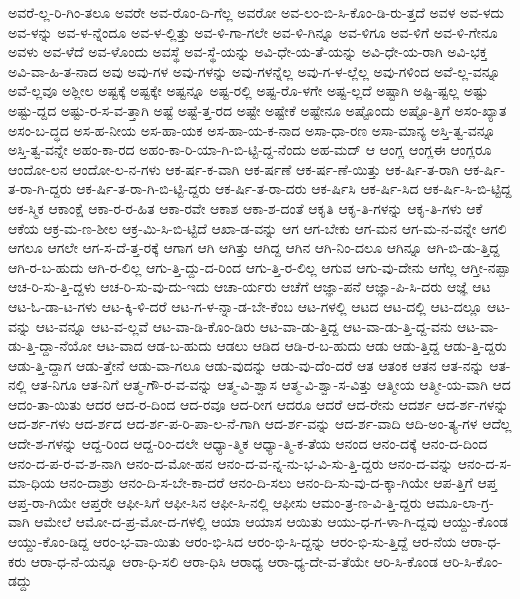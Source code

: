 {ಅವರೆ-ಲ್ಲ-ರಿ-ಗಿಂ-ತಲೂ
ಅವರೇ
ಅವ-ರೊಂ-ದಿ-ಗೆಲ್ಲ
ಅವರೋ
ಅವ-ಲಂ-ಬಿ-ಸಿ-ಕೊಂ-ಡಿ-ರು-ತ್ತದೆ
ಅವಳ
ಅವ-ಳದು
ಅವ-ಳನ್ನು
ಅವ-ಳ-ನ್ನೆಂದೂ
ಅವ-ಳ-ಲ್ಲಿತ್ತು
ಅವ-ಳಿ-ಗಾ-ಗಲೇ
ಅವ-ಳಿ-ಗಿನ್ನೂ
ಅವ-ಳಿಗೂ
ಅವ-ಳಿಗೆ
ಅವ-ಳಿ-ಗೇನೂ
ಅವಳು
ಅವ-ಳೆದೆ
ಅವ-ಳೊಂದು
ಅವಸ್ಥೆ
ಅವ-ಸ್ಥೆ-ಯನ್ನು
ಅವಿ-ಧೇ-ಯ-ತೆ-ಯನ್ನು
ಅವಿ-ಧೇ-ಯ-ರಾಗಿ
ಅವಿ-ಭಕ್ತ
ಅವಿ-ವಾ-ಹಿ-ತ-ನಾದ
ಅವು
ಅವು-ಗಳ
ಅವು-ಗಳನ್ನು
ಅವು-ಗಳನ್ನೆಲ್ಲ
ಅವು-ಗ-ಳ-ಲ್ಲೆಲ್ಲ
ಅವು-ಗಳಿಂದ
ಅವೆ-ಲ್ಲ-ವನ್ನೂ
ಅವೆ-ಲ್ಲವೂ
ಅಶ್ಲೀಲ
ಅಷ್ಟಕ್ಕೆ
ಅಷ್ಟಕ್ಕೇ
ಅಷ್ಟನ್ನೂ
ಅಷ್ಟ-ರಲ್ಲಿ
ಅಷ್ಟ-ರೊ-ಳಗೇ
ಅಷ್ಟ-ಲ್ಲದೆ
ಅಷ್ಟಾಗಿ
ಅಷ್ಟಿ-ಷ್ಟಲ್ಲ
ಅಷ್ಟು
ಅಷ್ಟು-ದ್ದದ
ಅಷ್ಟು-ರ-ಸ-ವ-ತ್ತಾಗಿ
ಅಷ್ಟೆ
ಅಷ್ಟೆ-ತ್ತ-ರದ
ಅಷ್ಟೇ
ಅಷ್ಟೇಕೆ
ಅಷ್ಟೇನೂ
ಅಷ್ಟೊಂದು
ಅಷ್ಟೊ-ತ್ತಿಗೆ
ಅಸಂ-ಖ್ಯಾತ
ಅಸಂ-ಬ-ದ್ಧದ
ಅಸ-ಹ-ನೀಯ
ಅಸ-ಹಾ-ಯಕ
ಅಸ-ಹಾ-ಯ-ಕ-ನಾದ
ಅಸಾ-ಧಾ-ರಣ
ಅಸಾ-ಮಾನ್ಯ
ಅಸ್ತಿ-ತ್ವ-ವನ್ನೂ
ಅಸ್ತಿ-ತ್ವ-ವನ್ನೇ
ಅಹಂ-ಕಾ-ರದ
ಅಹಂ-ಕಾ-ರಿ-ಯಾ-ಗಿ-ಬಿ-ಟ್ಟಿ-ದ್ದ-ನೆಂದು
ಅಹ-ಮದ್
ಆ
ಆಂಗ್ಲ
ಆಂಗ್ಲಈ
ಆಂಗ್ಲರೂ
ಆಂದೋ-ಲನ
ಆಂದೋ-ಲ-ನ-ಗಳು
ಆಕ-ರ್ಷ-ಕ-ವಾಗಿ
ಆಕ-ರ್ಷಣೆ
ಆಕ-ರ್ಷ-ಣೆ-ಯಿತ್ತು
ಆಕ-ರ್ಷಿ-ತ-ರಾಗಿ
ಆಕ-ರ್ಷಿ-ತ-ರಾ-ಗಿ-ದ್ದರು
ಆಕ-ರ್ಷಿ-ತ-ರಾ-ಗಿ-ಬಿ-ಟ್ಟಿ-ದ್ದರು
ಆಕ-ರ್ಷಿ-ತ-ರಾ-ದರು
ಆಕ-ರ್ಷಿಸಿ
ಆಕ-ರ್ಷಿ-ಸಿದ
ಆಕ-ರ್ಷಿ-ಸಿ-ಬಿ-ಟ್ಟಿದ್ದ
ಆಕ-ಸ್ಮಿಕ
ಆಕಾಂಕ್ಷೆ
ಆಕಾ-ರ-ರ-ಹಿತ
ಆಕಾ-ರವೇ
ಆಕಾಶ
ಆಕಾ-ಶ-ದಂತೆ
ಆಕೃತಿ
ಆಕೃ-ತಿ-ಗಳನ್ನು
ಆಕೃ-ತಿ-ಗಳು
ಆಕೆ
ಆಕೆಯ
ಆಕ್ರ-ಮ-ಣ-ಶೀಲ
ಆಕ್ರ-ಮಿ-ಸಿ-ಬಿ-ಟ್ಟಿದೆ
ಆಖಾ-ಡ-ವನ್ನು
ಆಗ
ಆಗ-ಬೇಕು
ಆಗ-ಮನ
ಆಗ-ಮ-ನ-ವನ್ನೇ
ಆಗಲಿ
ಆಗಲೂ
ಆಗಲೇ
ಆಗ-ಸ-ದೆ-ತ್ತ-ರಕ್ಕೆ
ಆಗಾಗ
ಆಗಿ
ಆಗಿತ್ತು
ಆಗಿದ್ದ
ಆಗಿನ
ಆಗಿ-ನಿಂ-ದಲೂ
ಆಗಿನ್ನೂ
ಆಗಿ-ಬಿ-ಡು-ತ್ತಿದ್ದ
ಆಗಿ-ರ-ಬ-ಹುದು
ಆಗಿ-ರ-ಲಿಲ್ಲ
ಆಗು-ತ್ತಿ-ದ್ದು-ದ-ರಿಂದ
ಆಗು-ತ್ತಿ-ರ-ಲಿಲ್ಲ
ಆಗುವ
ಆಗು-ವು-ದೇನು
ಆಗೆಲ್ಲ
ಆಗ್ತೀ-ನಪ್ಪಾ
ಆಚ-ರಿ-ಸು-ತ್ತಿ-ದ್ದಳು
ಆಚ-ರಿ-ಸು-ವು-ದು-ಇದು
ಆಚಾ-ರ್ಯರು
ಆಚೆಗೆ
ಆಜ್ಞಾ-ಪನೆ
ಆಜ್ಞಾ-ಪಿ-ಸಿ-ದರು
ಆಜ್ಞೆ
ಆಟ
ಆಟ-ಓ-ಡಾ-ಟ-ಗಳು
ಆಟ-ಕ್ಕಿ-ಳಿ-ದರೆ
ಆಟ-ಗ-ಳ-ನ್ನಾ-ಡ-ಬೇ-ಕೆಂಬ
ಆಟ-ಗಳಲ್ಲಿ
ಆಟದ
ಆಟ-ದಲ್ಲಿ
ಆಟ-ದಲ್ಲೂ
ಆಟ-ವನ್ನು
ಆಟ-ವನ್ನೂ
ಆಟ-ವ-ಲ್ಲವೆ
ಆಟ-ವಾ-ಡಿ-ಕೊಂ-ಡಿರು
ಆಟ-ವಾ-ಡು-ತ್ತಿದ್ದ
ಆಟ-ವಾ-ಡು-ತ್ತಿ-ದ್ದ-ವನು
ಆಟ-ವಾ-ಡು-ತ್ತಿ-ದ್ದಾ-ನೆಯೋ
ಆಟ-ವಾದ
ಆಡ-ಬ-ಹುದು
ಆಡಲು
ಆಡಿದ
ಆಡಿ-ರ-ಬ-ಹುದು
ಆಡು
ಆಡು-ತ್ತಿದ್ದ
ಆಡು-ತ್ತಿ-ದ್ದರು
ಆಡು-ತ್ತಿ-ದ್ದಾಗ
ಆಡು-ತ್ತೇನೆ
ಆಡು-ವಾ-ಗಲೂ
ಆಡು-ವುದನ್ನು
ಆಡು-ವು-ದೆಂ-ದರೆ
ಆತ
ಆತಂಕ
ಆತನ
ಆತ-ನನ್ನು
ಆತ-ನಲ್ಲಿ
ಆತ-ನಿಗೂ
ಆತ-ನಿಗೆ
ಆತ್ಮ-ಗೌ-ರ-ವ-ವನ್ನು
ಆತ್ಮ-ವಿ-ಶ್ವಾಸ
ಆತ್ಮ-ವಿ-ಶ್ವಾ-ಸ-ವಿತ್ತು
ಆತ್ಮೀಯ
ಆತ್ಮೀ-ಯ-ವಾಗಿ
ಆದ
ಆದಂ-ತಾ-ಯಿತು
ಆದರ
ಆದ-ರ-ದಿಂದ
ಆದ-ರವೂ
ಆದ-ರೀಗ
ಆದರೂ
ಆದರೆ
ಆದ-ರೇನು
ಆದರ್ಶ
ಆದ-ರ್ಶ-ಗಳನ್ನು
ಆದ-ರ್ಶ-ಗಳು
ಆದ-ರ್ಶದ
ಆದ-ರ್ಶ-ಪ-ರಿ-ಪಾ-ಲ-ನೆ-ಗಾಗಿ
ಆದ-ರ್ಶ-ವನ್ನು
ಆದ-ರ್ಶ-ವಾದಿ
ಆದಿ-ಅಂ-ತ್ಯ-ಗಳ
ಆದೆಲ್ಲ
ಆದೇ-ಶ-ಗಳನ್ನು
ಆದ್ದ-ರಿಂದ
ಆದ್ದ-ರಿಂ-ದಲೇ
ಆಧ್ಯಾ-ತ್ಮಿಕ
ಆಧ್ಯಾ-ತ್ಮಿ-ಕ-ತೆಯ
ಆನಂದ
ಆನಂ-ದಕ್ಕೆ
ಆನಂ-ದ-ದಿಂದ
ಆನಂ-ದ-ಪ-ರ-ವ-ಶ-ನಾಗಿ
ಆನಂ-ದ-ಮೋ-ಹನ
ಆನಂ-ದ-ವ-ನ್ನ-ನು-ಭ-ವಿ-ಸು-ತ್ತಿ-ದ್ದರು
ಆನಂ-ದ-ವನ್ನು
ಆನಂ-ದ-ಸ-ಮಾ-ಧಿಯ
ಆನಂ-ದಾಶ್ರು
ಆನಂ-ದಿ-ಸ-ಬೇ-ಕಾ-ದರೆ
ಆನಂ-ದಿ-ಸಲು
ಆನಂ-ದಿ-ಸು-ವು-ದ-ಕ್ಕಾ-ಗಿಯೇ
ಆಪ-ತ್ತಿಗೆ
ಆಪ್ತ
ಆಪ್ತ-ರಾ-ಗಿಯೇ
ಆಪ್ತರೇ
ಆಫೀ-ಸಿಗೆ
ಆಫೀ-ಸಿನ
ಆಫೀ-ಸಿ-ನಲ್ಲಿ
ಆಫೀಸು
ಆಮಂ-ತ್ರ-ಣ-ವಿ-ತ್ತಿ-ದ್ದರು
ಆಮೂ-ಲಾ-ಗ್ರ-ವಾಗಿ
ಆಮೇಲೆ
ಆಮೋ-ದ-ಪ್ರ-ಮೋ-ದ-ಗಳಲ್ಲಿ
ಆಯಾ
ಆಯಾಸ
ಆಯಿತು
ಆಯು-ಧ-ಗ-ಳಾ-ಗಿ-ದ್ದವು
ಆಯ್ದು-ಕೊಂಡ
ಆಯ್ದು-ಕೊಂ-ಡಿದ್ದ
ಆರಂ-ಭ-ವಾ-ಯಿತು
ಆರಂ-ಭಿ-ಸಿದ
ಆರಂ-ಭಿ-ಸಿ-ದ್ದನ್ನು
ಆರಂ-ಭಿ-ಸು-ತ್ತಿದ್ದೆ
ಆರ-ನೆಯ
ಆರಾ-ಧ-ಕರು
ಆರಾ-ಧ-ನೆ-ಯನ್ನೂ
ಆರಾ-ಧಿ-ಸಲಿ
ಆರಾ-ಧಿಸಿ
ಆರಾಧ್ಯ
ಆರಾ-ಧ್ಯ-ದೇ-ವ-ತೆಯೇ
ಆರಿ-ಸಿ-ಕೊಂಡ
ಆರಿ-ಸಿ-ಕೊಂ-ಡದ್ದು
}
